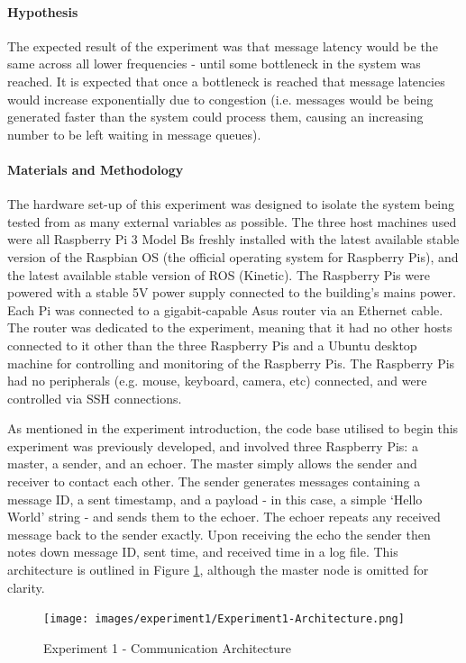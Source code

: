 \documentclass[../dissertation.tex]{subfiles}
\begin{document}
\paragraph{Hypothesis} The expected result of the experiment was that message latency would be the same across all lower frequencies - until some bottleneck in the system was reached. It is expected that once a bottleneck is reached that message latencies would increase exponentially due to congestion (i.e. messages would be being generated faster than the system could process them, causing an increasing number to be left waiting in message queues).

\paragraph{Materials and Methodology} The hardware set-up of this experiment was designed to isolate the system being tested from as many external variables as possible. The three host machines used were all Raspberry Pi 3 Model Bs freshly installed with the latest available stable version of the Raspbian OS (the official operating system for Raspberry Pis), and the latest available stable version of ROS (Kinetic). The Raspberry Pis were powered with a stable 5V power supply connected to the building's mains power. Each Pi was connected to a gigabit-capable Asus router via an Ethernet cable. The router was dedicated to the experiment, meaning that it had no other hosts connected to it other than the three Raspberry Pis and a Ubuntu desktop machine for controlling and monitoring of the Raspberry Pis. The Raspberry Pis had no peripherals (e.g. mouse, keyboard, camera, etc) connected, and were controlled via SSH connections.

As mentioned in the experiment introduction, the code base utilised to begin this experiment was previously developed\cite{Experiment1InitialCode}, and involved three Raspberry Pis: a master, a sender, and an echoer. The master simply allows the sender and receiver to contact each other. The sender generates messages containing a message ID, a sent timestamp, and a payload - in this case, a simple `Hello World' string - and sends them to the echoer. The echoer repeats any received message back to the sender exactly. Upon receiving the echo the sender then notes down message ID, sent time, and received time in a log file. This architecture is outlined in Figure \ref{exp1-architecture}, although the master node is omitted for clarity.

\begin{figure}[h]
\centering
\texttt{[image: images/experiment1/Experiment1-Architecture.png]}
\caption{Experiment 1 - Communication Architecture}
\label{exp1-architecture}
\end{figure}
\end{document}
